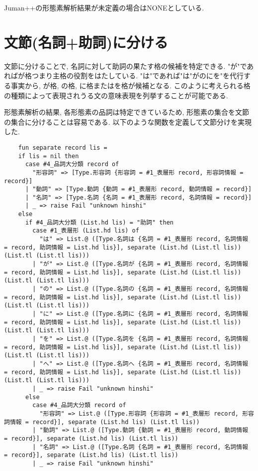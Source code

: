 \documentclass{jreport}
\begin{document}
Juman++の形態素解析結果が未定義の場合はNONEとしている.

\section{文節(名詞+助詞)に分ける}
文節に分けることで, 名詞に対して助詞の果たす格の候補を特定できる.
"が"であればが格つまり主格の役割をはたしている.
"は"であれば"は"がのにを"を代行する事実から, が格, の格, に格またはを格が候補となる.
このように考えられる格の種類によって表現されうる文の意味表現を列挙することが可能である.

形態素解析の結果, 各形態素の品詞は特定できているため, 形態素の集合を文節の集合に分けることは容易である.
以下のような関数を定義して文節分けを実現した.

\begin{Verbatim}
    fun separate record lis = 
    if lis = nil then
      case #4_品詞大分類 record of
        "形容詞" => [Type.形容詞 {形容詞 = #1_表層形 record, 形容詞情報 = record}]
      | "動詞" => [Type.動詞 {動詞 = #1_表層形 record, 動詞情報 = record}]
      | "名詞" => [Type.名詞 {名詞 = #1_表層形 record, 名詞情報 = record}]
      | _ => raise Fail "unknown hinshi"
    else
      if #4_品詞大分類 (List.hd lis) = "助詞" then
        case #1_表層形 (List.hd lis) of
          "は" => List.@ ([Type.名詞は {名詞 = #1_表層形 record, 名詞情報 = record, 助詞情報 = List.hd lis}], separate (List.hd (List.tl lis)) (List.tl (List.tl lis)))
        | "が" => List.@ ([Type.名詞が {名詞 = #1_表層形 record, 名詞情報 = record, 助詞情報 = List.hd lis}], separate (List.hd (List.tl lis)) (List.tl (List.tl lis)))
        | "の" => List.@ ([Type.名詞の {名詞 = #1_表層形 record, 名詞情報 = record, 助詞情報 = List.hd lis}], separate (List.hd (List.tl lis)) (List.tl (List.tl lis)))
        | "に" => List.@ ([Type.名詞に {名詞 = #1_表層形 record, 名詞情報 = record, 助詞情報 = List.hd lis}], separate (List.hd (List.tl lis)) (List.tl (List.tl lis)))
        | "を" => List.@ ([Type.名詞を {名詞 = #1_表層形 record, 名詞情報 = record, 助詞情報 = List.hd lis}], separate (List.hd (List.tl lis)) (List.tl (List.tl lis)))
        | "へ" => List.@ ([Type.名詞へ {名詞 = #1_表層形 record, 名詞情報 = record, 助詞情報 = List.hd lis}], separate (List.hd (List.tl lis)) (List.tl (List.tl lis)))
        | _ => raise Fail "unknown hinshi"
      else
        case #4_品詞大分類 record of
          "形容詞" => List.@ ([Type.形容詞 {形容詞 = #1_表層形 record, 形容詞情報 = record}], separate (List.hd lis) (List.tl lis))
        | "動詞" => List.@ ([Type.動詞 {動詞 = #1_表層形 record, 動詞情報 = record}], separate (List.hd lis) (List.tl lis))
        | "名詞" => List.@ ([Type.名詞 {名詞 = #1_表層形 record, 名詞情報 = record}], separate (List.hd lis) (List.tl lis))
        | _ => raise Fail "unknown hinshi"
\end{Verbatim}
\end{document}
